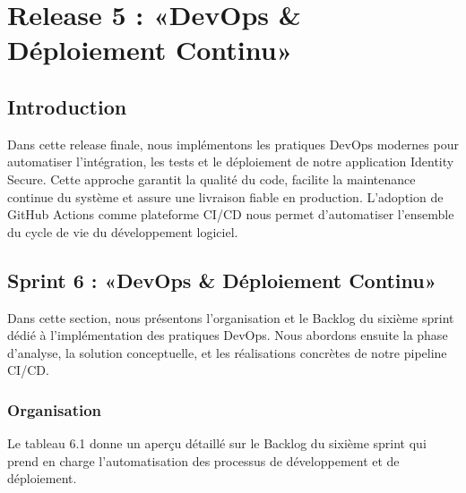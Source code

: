 \chapter{Release 5 : «DevOps \& Déploiement Continu»}
\label{chap_sprint6}

\section{Introduction}
\label{sec_introduction:ch6}
Dans cette release finale, nous implémentons les pratiques DevOps modernes pour automatiser l'intégration, les tests et le déploiement de notre application Identity Secure. Cette approche garantit la qualité du code, facilite la maintenance continue du système et assure une livraison fiable en production. L'adoption de GitHub Actions comme plateforme CI/CD nous permet d'automatiser l'ensemble du cycle de vie du développement logiciel.

\section{Sprint 6 : «DevOps \& Déploiement Continu»}
Dans cette section, nous présentons l'organisation et le Backlog du sixième sprint dédié à l'implémentation des pratiques DevOps. Nous abordons ensuite la phase d'analyse, la solution conceptuelle, et les réalisations concrètes de notre pipeline CI/CD.

\subsection{Organisation}
Le tableau 6.1 donne un aperçu détaillé sur le Backlog du sixième sprint qui prend en charge l'automatisation des processus de développement et de déploiement.

